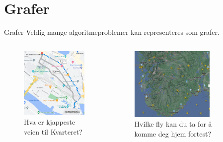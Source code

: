 \section{Grafer}

\begin{frame}[fragile]{Grafer}
    Veldig mange algoritmeproblemer kan representeres som grafer.
    \begin{columns}
        \begin{column}{0.3\textwidth}
            \begin{figure}
                \includegraphics[width=4cm]{images/Kvarteret.png}
                \caption{Hva er kjappeste veien til Kvarteret?}
            \end{figure}
        \end{column}
        \begin{column}{0.3\textwidth}
            \begin{figure}
                \includegraphics[width=4cm]{images/Bergen.png}
                \caption{Hvilke fly kan du ta for å komme deg hjem fortest?}
            \end{figure}
        \end{column}
        \begin{column}{0.3\textwidth}
        \end{column}
    \end{columns}
\end{frame}



